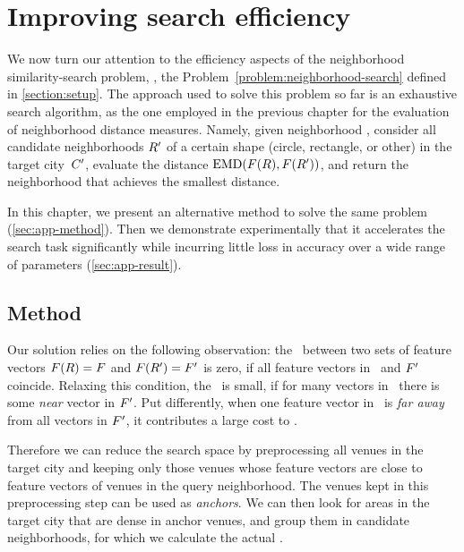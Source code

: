 \chapter{Improving search efficiency}
\label{chap:approx}
\iffalse

We now turn our attention to the efficiency aspects of the neighborhood
similarity-search problem, \ie{}, the Problem~\ref{problem:neighborhood-search}
defined in \autoref{section:setup}. The approach used to solve this problem so
far is an exhaustive search algorithm, as the one employed in the previous
chapter for the evaluation of neighborhood distance measures. Namely, given
neighborhood \region, consider all candidate neighborhoods ${R}'$ of a
certain shape (circle, rectangle, or other) in the target city~${C}'$,
evaluate the distance $\mathrm{{EMD}}({F}({R}),{F}({R}'))$, and
return the neighborhood that achieves the smallest distance. 

In this chapter, we present an alternative method to solve the same problem
(\autoref{sec:app-method}). Then we demonstrate experimentally that it
accelerates the search task significantly while incurring little loss in
accuracy over a wide range of parameters (\autoref{sec:app-result}).


\section{Method}
\label{sec:app-method}

Our solution relies on the following observation: the \emd\ between two sets
of feature vectors ${F}({R})={F}$ and ${F}({R}')={F}'$ is zero,
if all feature vectors in \vfvs\ and ${F}'$ coincide. Relaxing this
condition, the \emd\ is small, if for many vectors in \vfvs\ there is some
\emph{near} vector in ${F}'$. Put differently, when one feature vector in \vfvs\
is \emph{far away} from all vectors in ${F}'$, it contributes a large cost to
\emd.

Therefore we can reduce the search space by preprocessing all venues in the
target city and keeping only those venues whose feature vectors are close to
feature vectors of venues in the query neighborhood. The venues kept in this
preprocessing step can be used as \emph{anchors}. We can then look for areas
in the target city that are dense in anchor venues, and group them in candidate
neighborhoods, for which we calculate the actual \emd{}.

\medskip

